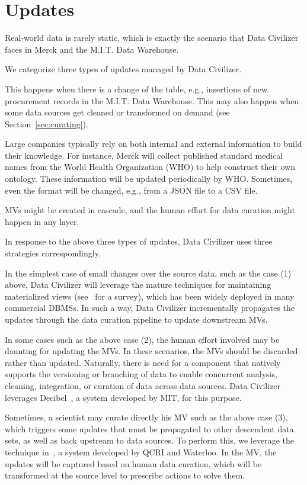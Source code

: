\section{Updates}
\label{sec:updates}

Real-world data is rarely static, which is exactly the scenario that Data Civilizer faces in Merck and the M.I.T. Data Warehouse.

We categorize three types of updates managed by Data Civilizer.

This happens when there is a change of the table, e.g., insertions of new procurement records in the M.I.T. Data Warehouse. This may also happen when some data sources get cleaned or transformed on demand (see Section~\ref{sec:curating}).

Large companies typically rely on both internal and external information to build their knowledge. For instance, Merck will collect published standard medical names from the World Health Organization (WHO) to help construct their own ontology. These information will be updated periodically by WHO. Sometimes, even the format will be changed, e.g., from a JSON file to a CSV file.

MVs might be created in cascade, and the human effort for data curation might happen in any layer. 

In response to the above three types of updates, Data Civilizer uses three strategies correspondingly.

In the simplest case of small changes over the source data, such as the case (1) above, Data Civilizer will leverage the mature techniques for maintaining materialized views (see~\cite{DBLP:journals/debu/GuptaM95} for a survey), which has been widely deployed in many commercial DBMSs. In such a way, Data Civilizer incrementally propagates the updates through the data curation pipeline to update downstream MVs.  

In some cases such as the above case (2), the human effort involved may be daunting for updating the MVs. In these scenarios, the MVs should be discarded rather than updated. Naturally, there is need for a component that natively supports the versioning or branching of data to enable concurrent analysis, cleaning, integration, or curation of data across data sources. 
%
Data Civilizer leverages Decibel~\cite{DBLP:journals/pvldb/MaddoxGEMPD16}, a system developed by MIT, for this purpose.

Sometimes, a scientist may curate directly his MV such as the above case (3), which triggers some updates that must be propagated to other descendent data sets, as well as back upstream to data sources. To perform this, we leverage the technique in~\cite{DBLP:conf/sigmod/ChalamallaIOP14}, a system developed by QCRI and Waterloo. In the MV, the updates will be captured based on human data curation, which will be transformed at the source level to prescribe actions to solve them. 
